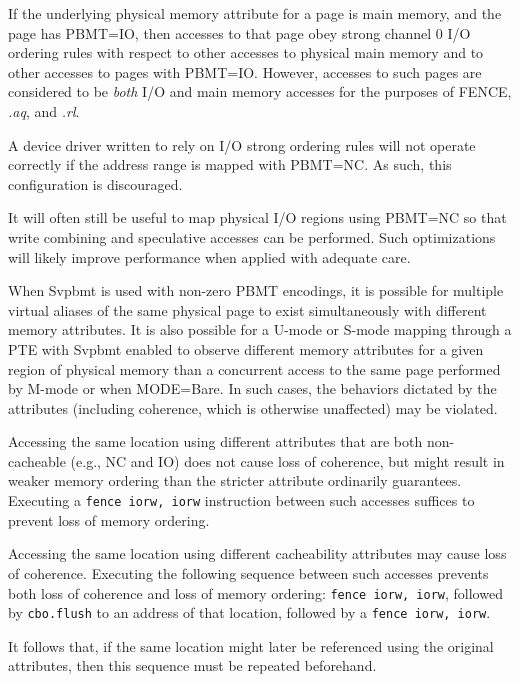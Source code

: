 If the underlying physical memory attribute for a page is main memory, and the
page has PBMT=IO, then accesses to that page obey strong channel 0 I/O ordering
rules with respect to other accesses to physical main memory and to other
accesses to pages with PBMT=IO.
However, accesses to such pages are
considered to be {\em both} I/O and main memory accesses for the purposes of FENCE,
{\em.aq}, and {\em.rl}.

\begin{commentary}
A device driver written to rely on I/O strong ordering rules will not
operate correctly if the address range is mapped with PBMT=NC.
As such, this configuration is discouraged.

It will often still be useful to map physical I/O regions using PBMT=NC so that
write combining and speculative accesses can be performed.  Such optimizations
will likely improve performance when applied with adequate care.
\end{commentary}

When Svpbmt is used with non-zero PBMT encodings,
it is possible for multiple virtual aliases of the same
physical page to exist simultaneously with different memory attributes.  It is
also possible for a U-mode or S-mode mapping through a PTE with Svpbmt enabled
to observe different memory attributes for a given region of physical memory
than a concurrent access to the same page performed by M-mode or when
MODE=Bare.  In such cases, the behaviors dictated by the attributes (including
coherence, which is otherwise unaffected) may be violated.

Accessing the same location using different attributes that are both non-cacheable
(e.g., NC and IO) does not cause loss of coherence, but might result in weaker
memory ordering than the stricter attribute ordinarily guarantees.
Executing a {\tt fence iorw, iorw} instruction between such accesses suffices
to prevent loss of memory ordering.

Accessing the same location using different cacheability attributes may cause loss
of coherence.
Executing the following sequence between such accesses prevents both loss of
coherence and loss of memory ordering:
{\tt fence iorw, iorw}, followed by {\tt cbo.flush} to an address of
that location, followed by a {\tt fence iorw, iorw}.

\begin{commentary}
It follows that, if the same location might later be referenced using the
original attributes, then this sequence must be repeated beforehand.
\end{commentary}

